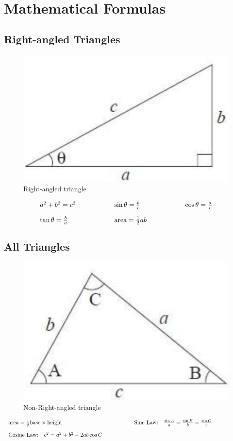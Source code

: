 \documentclass[12pt,a4paper]{article}
\begin{document}
\newpage
\section{Mathematical Formulas}

\subsection{Right-angled Triangles}

\begin{figure}[H]
    \centering
    \includegraphics[width=0.4\linewidth]{11 Formula Sheet/rt.png}
    \caption{Right-angled triangle}
    \label{fig:Right-angled triangle}
\end{figure}

\begin{align*}
  \begin{array}{l@{\hspace{2cm}}l@{\hspace{2cm}}l}
    a^2 + b^2 = c^2 & \sin \theta = \frac{b}{c} & \cos \theta = \frac{a}{c} \\[1em]
    \tan \theta = \frac{b}{a} & \text{area} = \frac{1}{2}ab &
  \end{array}
\end{align*}

\subsection{All Triangles}
\begin{figure}[H]
    \centering
    \includegraphics[width=0.4\linewidth]{11 Formula Sheet/nrt.png}
    \caption{Non-Right-angled triangle}
    \label{fig:Non-Right-angled triangle}
\end{figure}

\begin{align*}
  \begin{array}{l@{\hspace{2cm}}l@{\hspace{2cm}}l}
    \text{area} = \frac{1}{2} \text{base} \times \text{height} & \text{Sine Law:} \quad \frac{\sin A}{a} = \frac{\sin B}{b} = \frac{\sin C}{c} & \\[1em]
    \text{Cosine Law:} \quad c^2 = a^2 + b^2 - 2ab \cos C & &
  \end{array}
\end{align*}
\end{document}
